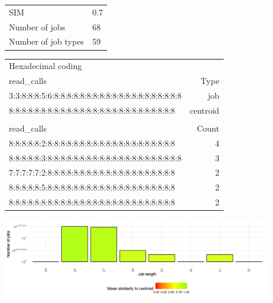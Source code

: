 \documentclass[]{llncs}
\begin{document}
\begingroup
  \centering
  \begin{tabular}{ll}
    SIM                 & 0.7 \\ 
    Number of jobs      & 68  \\ 
    Number of job types & 59  \\ 
  \end{tabular}
  \label{tab:use_case:pm_quant:stats}
\endgroup

\begingroup
  \centering
  \begin{tiny}
    \begin{tabular}{@{ }l@{ }|@{ }r@{ }}
      \rowcolor{tabhcolor}
      Hexadecimal coding & \\
      \rowcolor{tabhcolor}
      read\_calls                                           & Type     \\ 
      \hline
      3:3:8:8:8:5:6:8:8:8:8:8:8:8:8:8:8:8:8:8:8:8:8:8:8:8:8 & job      \\ 
      8:8:8:8:8:8:8:8:8:8:8:8:8:8:8:8:8:8:8:8:8:8:8:8:8:8   & centroid \\ 
      \multicolumn{2}{l}{}\\
      \rowcolor{tabhcolor}
      read\_calls                                           & Count    \\ 
      \hline
      8:8:8:8:8:2:8:8:8:8:8:8:8:8:8:8:8:8:8:8:8:8:8:8:8:8   & 4        \\ 
      8:8:8:8:8:3:8:8:8:8:8:8:8:8:8:8:8:8:8:8:8:8:8:8:8:8:8 & 3        \\ 
      7:7:7:7:7:2:8:8:8:8:8:8:8:8:8:8:8:8:8:8:8:8:8:8:8:8   & 2        \\ 
      8:8:8:8:8:5:8:8:8:8:8:8:8:8:8:8:8:8:8:8:8:8:8:8:8:8   & 2        \\ 
      8:8:8:8:8:8:8:8:8:8:8:8:8:8:8:8:8:8:8:8:8:8:8:8:8:8   & 2        \\ 
    \end{tabular}
  \end{tiny}
  \label{tab:use_case:pm_quant:top_jobs}
\endgroup

\begingroup
  \centering
  \includegraphics[width=4.61in,height=1.39in]{./media/image7.png}
  \label{fig:use_case:pm_quant:length}
\endgroup
\end{document}
